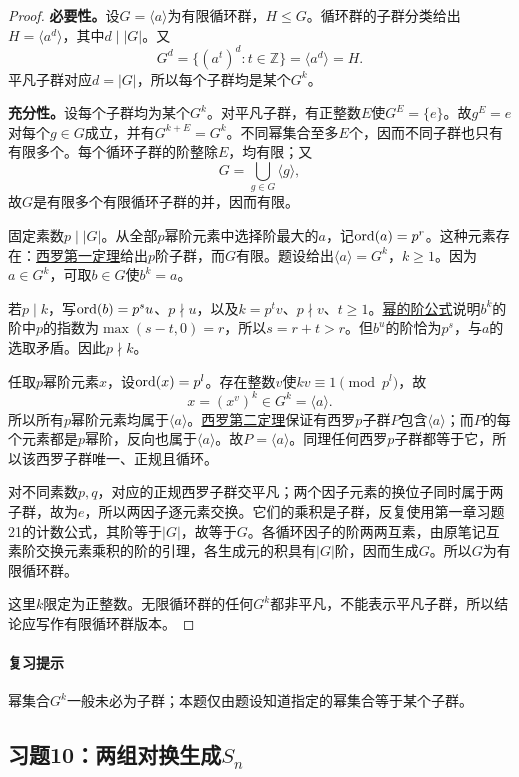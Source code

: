 \documentclass[UTF8,a4paper,11pt,fontset=windows]{ctexart}
\newcommand{\Z}{\mathbb Z}\newcommand{\Q}{\mathbb Q}
\newcommand{\proofref}[2]{\hyperref[note:#1]{#2}}
\begin{document}
\begin{proof}
\textbf{必要性。}设$G=\langle a\rangle$为有限循环群，$H\leq G$。循环群的子群分类给出$H=\langle a^d\rangle$，其中$d\mid|G|$。又
\[
G^d=\{(a^t)^d:t\in\Z\}=\langle a^d\rangle=H.
\]
平凡子群对应$d=|G|$，所以每个子群均是某个$G^k$。

\textbf{充分性。}设每个子群均为某个$G^k$。对平凡子群，有正整数$E$使$G^E=\{e\}$。故$g^E=e$对每个$g\in G$成立，并有$G^{k+E}=G^k$。不同幂集合至多$E$个，因而不同子群也只有有限多个。每个循环子群的阶整除$E$，均有限；又
\[
G=\bigcup_{g\in G}\langle g\rangle,
\]
故$G$是有限多个有限循环子群的并，因而有限。

固定素数$p\mid|G|$。从全部$p$幂阶元素中选择阶最大的$a$，记$\operatorname{ord}(a)=p^r$。这种元素存在：\proofref{sylow1}{西罗第一定理}给出$p$阶子群，而$G$有限。题设给出$\langle a\rangle=G^k$，$k\geq1$。因为$a\in G^k$，可取$b\in G$使$b^k=a$。

若$p\mid k$，写$\operatorname{ord}(b)=p^su$、$p\nmid u$，以及$k=p^tv$、$p\nmid v$、$t\geq1$。\proofref{powerorder}{幂的阶公式}说明$b^k$的阶中$p$的指数为$\max(s-t,0)=r$，所以$s=r+t>r$。但$b^u$的阶恰为$p^s$，与$a$的选取矛盾。因此$p\nmid k$。

任取$p$幂阶元素$x$，设$\operatorname{ord}(x)=p^l$。存在整数$v$使$kv\equiv1\pmod{p^l}$，故
\[
x=(x^v)^k\in G^k=\langle a\rangle.
\]
所以所有$p$幂阶元素均属于$\langle a\rangle$。\proofref{sylow2}{西罗第二定理}保证有西罗$p$子群$P$包含$\langle a\rangle$；而$P$的每个元素都是$p$幂阶，反向也属于$\langle a\rangle$。故$P=\langle a\rangle$。同理任何西罗$p$子群都等于它，所以该西罗子群唯一、正规且循环。

对不同素数$p,q$，对应的正规西罗子群交平凡；两个因子元素的换位子同时属于两子群，故为$e$，所以两因子逐元素交换。它们的乘积是子群，反复使用第一章习题21的计数公式，其阶等于$|G|$，故等于$G$。各循环因子的阶两两互素，由原笔记互素阶交换元素乘积的阶的引理，各生成元的积具有$|G|$阶，因而生成$G$。所以$G$为有限循环群。

这里$k$限定为正整数。无限循环群的任何$G^k$都非平凡，不能表示平凡子群，所以结论应写作有限循环群版本。
\end{proof}

\paragraph{复习提示}
幂集合$G^k$一般未必为子群；本题仅由题设知道指定的幂集合等于某个子群。


\subsection{习题10：\texorpdfstring{两组对换生成$S_n$}{两组对换生成Sn}}
\label{ex:2:10}
\end{document}
